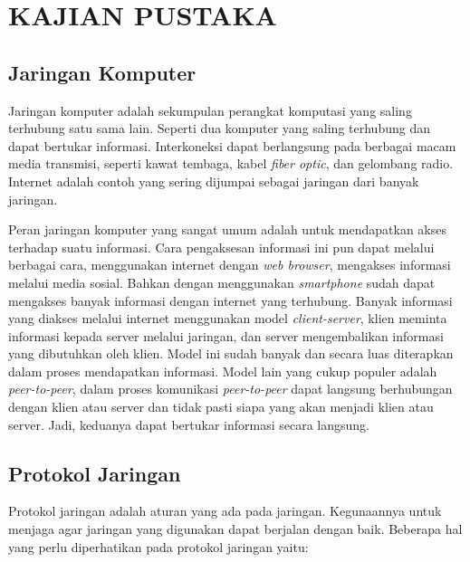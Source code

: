 
\chapter{KAJIAN PUSTAKA}

\section{Jaringan Komputer}

Jaringan komputer adalah sekumpulan perangkat komputasi yang saling terhubung satu sama lain. Seperti dua komputer yang saling terhubung dan dapat bertukar informasi. Interkoneksi dapat berlangsung pada berbagai macam media transmisi, seperti kawat tembaga, kabel \emph{fiber optic}, dan gelombang radio. Internet adalah contoh yang sering dijumpai sebagai jaringan dari banyak jaringan.

Peran jaringan komputer yang sangat umum adalah untuk mendapatkan akses terhadap suatu informasi. Cara pengaksesan informasi ini pun dapat melalui berbagai cara, menggunakan internet dengan \emph{web browser}, mengakses informasi melalui media sosial. Bahkan dengan menggunakan \emph{smartphone} sudah dapat mengakses banyak informasi dengan internet yang terhubung. Banyak informasi yang diakses melalui internet menggunakan model \emph{client-server}, klien meminta informasi kepada server melalui jaringan, dan server mengembalikan informasi yang dibutuhkan oleh klien. Model ini sudah banyak dan secara luas diterapkan dalam proses mendapatkan informasi. Model lain yang cukup populer adalah \emph{peer-to-peer}, dalam proses komunikasi \emph{peer-to-peer} dapat langsung berhubungan dengan klien atau server dan tidak pasti siapa yang akan menjadi klien atau server. Jadi, keduanya dapat bertukar informasi secara langsung.

\section{Protokol Jaringan}

Protokol jaringan adalah aturan yang ada pada jaringan. Kegunaannya untuk menjaga agar jaringan yang digunakan dapat berjalan dengan baik. Beberapa hal yang perlu diperhatikan pada protokol jaringan yaitu:

